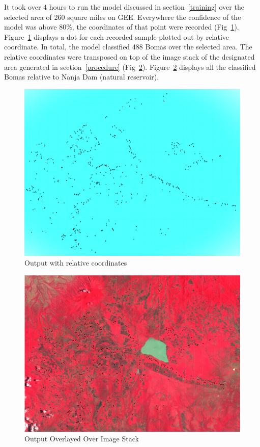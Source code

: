 \documentclass[10pt]{article}
\begin{document}
It took over 4 hours to run the model discussed in section~\ref{training} over the selected area of 260 square miles on GEE. Everywhere the confidence of the model was above 80\%, the coordinates of that point were recorded (Fig~\ref{fig:OutputOnSample}). Figure~\ref{fig:OutputOnSample} displays a dot for each recorded sample plotted out by relative coordinate. In total, the model classified 488 Bomas over the selected area. The relative coordinates were transposed on top of the image stack of the designated area generated in section~\ref{procedure} (Fig~\ref{fig:OverlayedMap}). Figure~\ref{fig:OverlayedMap} displays all the classified Bomas relative to Nanja Dam (natural reservoir).

\begin{figure} [H]
    \centering
    \includegraphics[width=1\linewidth]{images/cv_output.png}
    \caption{Output with relative coordinates}
    \label{fig:OutputOnSample}
\end{figure}

\begin{figure} [H]
    \centering
    \includegraphics[width=1\linewidth]{images/Outputoverlayrealmap.png}
    \caption{Output Overlayed Over Image Stack}
    \label{fig:OverlayedMap}
\end{figure}
\end{document}
